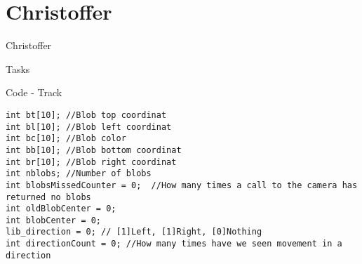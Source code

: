 \section{Christoffer}
\begin{frame}{Christoffer}
\begin{itemize}
\end{itemize}
\end{frame}

\begin{frame}[fragile]{Tasks}
\end{frame}

\begin{frame}[fragile]{Code - Track}
\begin{center}
\begin{minipage}[H]{0.9\linewidth}
\begin{lstlisting}
int bt[10]; //Blob top coordinat
int bl[10]; //Blob left coordinat
int bc[10]; //Blob color
int bb[10]; //Blob bottom coordinat
int br[10]; //Blob right coordinat
int nblobs; //Number of blobs
int blobsMissedCounter = 0;  //How many times a call to the camera has returned no blobs
int oldBlobCenter = 0;
int blobCenter = 0;
lib_direction = 0; // [1]Left, [1]Right, [0]Nothing
int directionCount = 0; //How many times have we seen movement in a direction
\end{lstlisting} 
\end{minipage}
\end{center}
\end{frame}